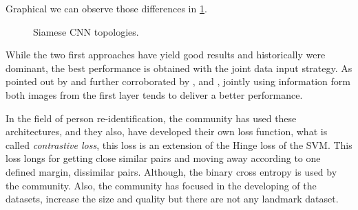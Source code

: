 Graphical we can observe those differences in \ref{siamese2Data1}.
\begin{figure}[H]
		
\centering


\caption{Siamese CNN topologies.}
\label{siamese2Data1}
\end{figure}


While the two first approaches have yield good results and historically were dominant, the best performance is obtained with the joint data input strategy. As pointed out by  \cite{patch1} and further corroborated by \cite{patch2}, and \cite{patch3}, jointly using information form both images from the first layer tends to deliver a better performance. 


In the field of person re-identification, the community has used these architectures, and they also, have developed their own loss function, what is called \textit{contrastive loss}, this loss is an extension of the Hinge loss of the SVM. This loss longs for getting close similar pairs and moving away according to one defined margin, dissimilar pairs. Although, the binary cross entropy is used by the community. Also, the community has focused in the developing of the datasets, increase the size and quality but there are not any landmark dataset.


